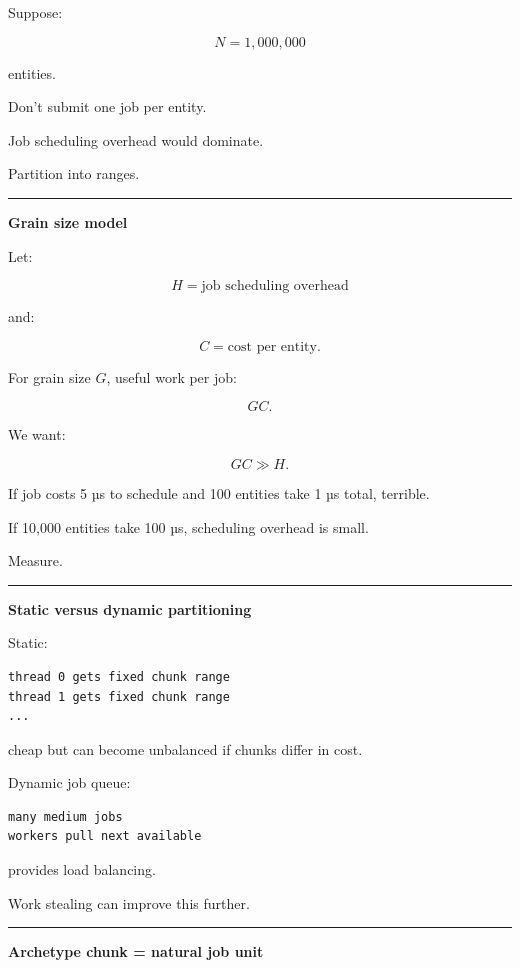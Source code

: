Suppose:

\[
N=1,000,000
\]

entities.

Don't submit one job per entity.

Job scheduling overhead would dominate.

Partition into ranges.

\begin{center}\rule{0.5\linewidth}{0.5pt}\end{center}

\textbf{Grain size model}

Let:

\[
H=
\text{job scheduling overhead}
\]

and:

\[
C=
\text{cost per entity}.
\]

For grain size \(G\), useful work per job:

\[
GC.
\]

We want:

\[
\boxed{
GC\gg H.
}
\]

If job costs 5 µs to schedule and 100 entities take 1 µs total, terrible.

If 10,000 entities take 100 µs, scheduling overhead is small.

Measure.

\begin{center}\rule{0.5\linewidth}{0.5pt}\end{center}

\textbf{Static versus dynamic partitioning}

Static:

\begin{verbatim}
thread 0 gets fixed chunk range
thread 1 gets fixed chunk range
...
\end{verbatim}

cheap but can become unbalanced if chunks differ in cost.

Dynamic job queue:

\begin{verbatim}
many medium jobs
workers pull next available
\end{verbatim}

provides load balancing.

Work stealing can improve this further.

\begin{center}\rule{0.5\linewidth}{0.5pt}\end{center}

\textbf{Archetype chunk = natural job unit}

